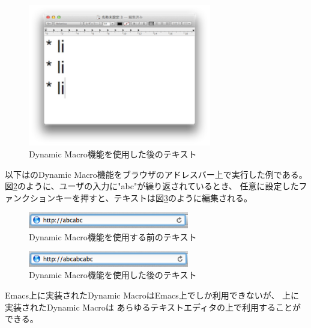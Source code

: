 \begin{figure}[H]
\centerline{\includegraphics[width=80mm,bb=0 0 360 220]{figures/dynamic2.png}}
\caption{Dynamic Macro機能を使用した後のテキスト}
\label{dynamic2}
\end{figure}


以下は{\system}のDynamic Macro機能をブラウザのアドレスバー上で実行した例である。
図\ref{dynamic3}のように、ユーザの入力に"abc"が繰り返されているとき、
任意に設定したファンクションキーを押すと、テキストは図\ref{dynamic4}のように編集される。

\begin{figure}[H]
\centerline{\includegraphics[width=70mm,bb=0 0 360 50]{figures/dynamic3.png}}
\caption{Dynamic Macro機能を使用する前のテキスト}
\label{dynamic3}
\end{figure}

\begin{figure}[H]
\centerline{\includegraphics[width=70mm,bb=0 0 360 50]{figures/dynamic4.png}}
\caption{Dynamic Macro機能を使用した後のテキスト}
\label{dynamic4}
\end{figure}

Emacs上に実装されたDynamic MacroはEmacs上でしか利用できないが、
{\system}上に実装されたDynamic Macroは
あらゆるテキストエディタの上で利用することができる。


